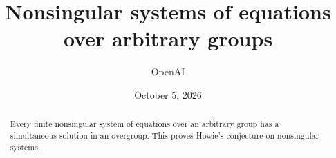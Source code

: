 \documentclass[11pt]{article}
\title{Nonsingular systems of equations over arbitrary groups}
\author{OpenAI}
\date{October 5, 2026}
\theoremstyle{definition}
\theoremstyle{remark}
\numberwithin{equation}{section}
\begin{document}
\maketitle
\begin{abstract}
Every finite nonsingular system of equations over an arbitrary group has
a simultaneous solution in an overgroup. This proves Howie's conjecture
on nonsingular systems.
\end{abstract}






\end{document}
